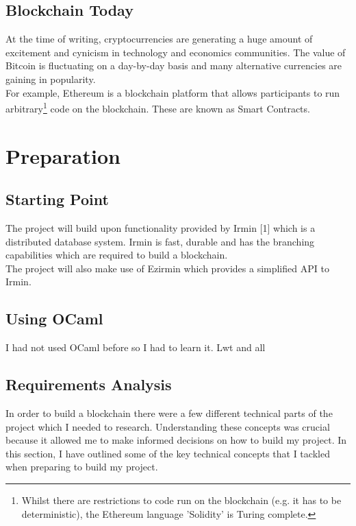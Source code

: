 \documentclass[12pt,a4paper,twoside,openright]{report}
\begin{document}
	\section{Blockchain Today}
	At the time of writing, cryptocurrencies are generating a huge amount of excitement and cynicism in technology and economics communities. The value of Bitcoin is fluctuating on a day-by-day basis and many alternative currencies are gaining in popularity.\\
	For example, Ethereum is a blockchain platform that allows participants to run arbitrary\footnote{Whilst there are restrictions to code run on the blockchain (e.g. it has to be deterministic), the Ethereum language 'Solidity' is Turing complete.} code on the blockchain. These are known as Smart Contracts.

	\chapter{Preparation}
	\section{Starting Point}
		The project will build upon functionality provided by Irmin [1] which is a distributed database system.  Irmin is fast,  durable and has the branching capabilities which are required to build a blockchain.\\
		The project will also make use of Ezirmin\cite{Ezirmin} which provides a simplified API to Irmin.\\
	\section{Using OCaml}
		I had not used OCaml before so I had to learn it. Lwt and all
	\section{Requirements Analysis}
		In order to build a blockchain there were a few different technical parts of the project which I needed to research. 
		Understanding these concepts was crucial because it allowed me to make informed decisions on how to build my project.
		In this section, I have outlined some of the key technical concepts that I tackled when preparing to build my project.
\end{document}
